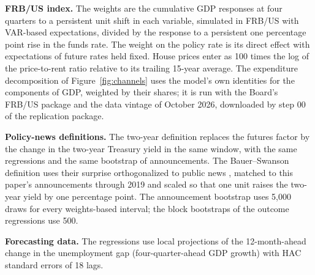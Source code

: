 \begin{appendices}
\textbf{FRB/US index.} The weights are the cumulative GDP responses at four quarters to a persistent unit shift in each variable, simulated in FRB/US with VAR-based expectations, divided by the response to a persistent one percentage point rise in the funds rate. The weight on the policy rate is its direct effect with expectations of future rates held fixed. House prices enter as 100 times the log of the price-to-rent ratio relative to its trailing 15-year average. The expenditure decomposition of Figure~\ref{fig:channels} uses the model's own identities for the components of GDP, weighted by their shares; it is run with the Board's FRB/US package and the data vintage of October 2026, downloaded by step 00 of the replication package.

\textbf{Policy-news definitions.} The two-year definition replaces the futures factor by the change in the two-year Treasury yield in the same window, with the same regressions and the same bootstrap of announcements. The Bauer--Swanson definition uses their surprise orthogonalized to public news \citep{bauer2023}, matched to this paper's announcements through 2019 and scaled so that one unit raises the two-year yield by one percentage point. The announcement bootstrap uses 5,000 draws for every weights-based interval; the block bootstraps of the outcome regressions use 500.

\textbf{Forecasting data.} The regressions use local projections of the 12-month-ahead change in the unemployment gap (four-quarter-ahead GDP growth) with HAC standard errors of 18 lags.


\end{appendices}

